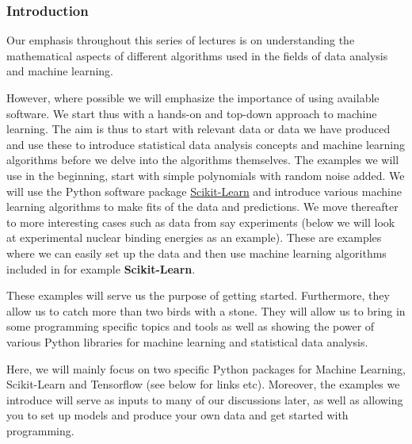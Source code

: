 \documentclass{beamer}
\begin{document}
\begin{frame}
\frametitle{Introduction}

Our emphasis throughout this series of lectures  
is on understanding the mathematical aspects of
different algorithms used in the fields of data analysis and machine learning. 

However, where possible we will emphasize the
importance of using available software. We start thus with a hands-on
and top-down approach to machine learning. The aim is thus to start with
relevant data or data we have produced 
and use these to introduce statistical data analysis
concepts and machine learning algorithms before we delve into the
algorithms themselves. The examples we will use in the beginning, start with simple
polynomials with random noise added. We will use the Python
software package \href{{http://scikit-learn.org/stable/}}{Scikit-Learn} and
introduce various machine learning algorithms to make fits of
the data and predictions. We move thereafter to more interesting
cases such as data from say experiments (below we will look at experimental nuclear binding energies as an example).
These are examples where we can easily set up the data and
then use machine learning algorithms included in for example
\textbf{Scikit-Learn}. 

These examples will serve us the purpose of getting
started. Furthermore, they allow us to catch more than two birds with
a stone. They will allow us to bring in some programming specific
topics and tools as well as showing the power of various Python 
libraries for machine learning and statistical data analysis.  

Here, we will mainly focus on two
specific Python packages for Machine Learning, Scikit-Learn and
Tensorflow (see below for links etc).  Moreover, the examples we
introduce will serve as inputs to many of our discussions later, as
well as allowing you to set up models and produce your own data and
get started with programming.
\end{frame}
\end{document}
